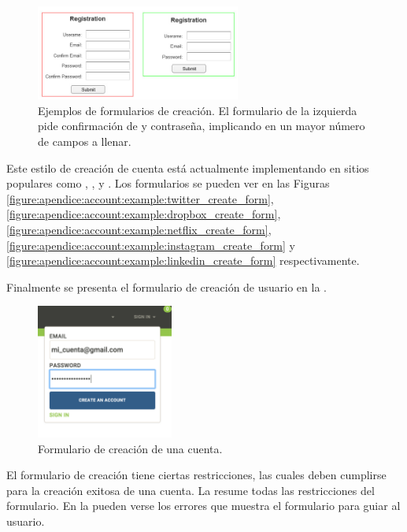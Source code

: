 \begin{figure}[H]
	\centering
	\includegraphics[width=0.6\textwidth]{figuras/account/examples/form_compare.png}

	\caption{Ejemplos de formularios de creación. El formulario de la izquierda pide confirmación de \email y contraseña, implicando en un mayor número de campos a llenar.}
	\label{figure:account:create_account:form_compare}
\end{figure}

Este estilo de creación de cuenta está actualmente implementando en sitios populares como \twitterNAME, \dropboxNAME, \netflixNAME \instagramNAME y \linkedInNAME. Los formularios se pueden ver en las Figuras \ref{figure:apendice:account:example:twitter_create_form}, \ref{figure:apendice:account:example:dropbox_create_form}, \ref{figure:apendice:account:example:netflix_create_form}, \ref{figure:apendice:account:example:instagram_create_form} y \ref{figure:apendice:account:example:linkedin_create_form} respectivamente.


Finalmente se presenta el formulario de creación de usuario en la .
\begin{figure}[H]
	\centering
	\includegraphics[width=0.4\textwidth]{figuras/architecture/accounts/new/form.png}

	\caption{Formulario de creación de una cuenta.}
	\label{figure:account:create_account:form}
\end{figure}



El formulario de creación tiene ciertas restricciones, las cuales deben cumplirse para la creación exitosa de una cuenta. La  resume todas las restricciones del formulario. En la  pueden verse los errores que muestra el formulario para guiar al usuario.

